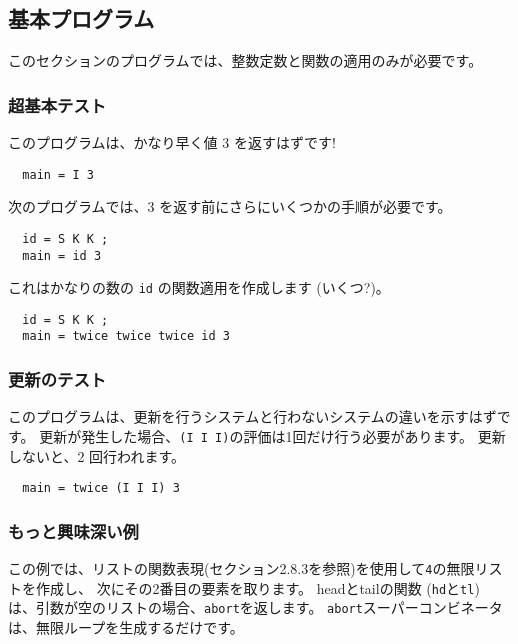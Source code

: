 \documentclass{jarticle}
\begin{document}
\subsection{基本プログラム}

このセクションのプログラムでは、整数定数と関数の適用のみが必要です。

\subsubsection{超基本テスト}

このプログラムは、かなり早く値 3 を返すはずです!

\begin{verbatim}
  main = I 3
\end{verbatim}

次のプログラムでは、3 を返す前にさらにいくつかの手順が必要です。

\begin{verbatim}
  id = S K K ;
  main = id 3
\end{verbatim}

これはかなりの数の \texttt{id} の関数適用を作成します (いくつ?)。

\begin{verbatim}
  id = S K K ;
  main = twice twice twice id 3
\end{verbatim}

\subsubsection{更新のテスト}

このプログラムは、更新を行うシステムと行わないシステムの違いを示すはずです。
更新が発生した場合、\texttt{(I I I)}の評価は1回だけ行う必要があります。
更新しないと、2 回行われます。

\begin{verbatim}
  main = twice (I I I) 3
\end{verbatim}

\subsubsection{もっと興味深い例}

この例では、リストの関数表現(セクション2.8.3を参照)を使用して\texttt{4}の無限リストを作成し、
次にその2番目の要素を取ります。
headとtailの関数 (\texttt{hd}と\texttt{tl}) は、引数が空のリストの場合、\texttt{abort}を返します。
\texttt{abort}スーパーコンビネータは、無限ループを生成するだけです。
\end{document}
